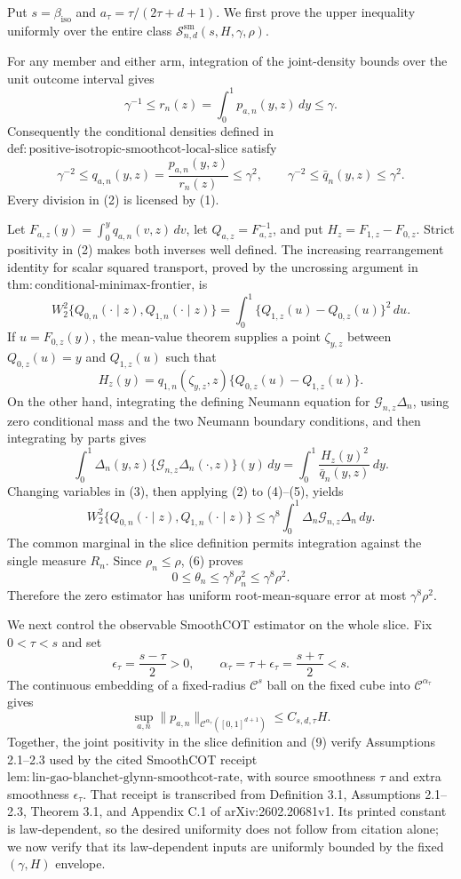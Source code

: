 Put \(s=\beta_{\mathrm{iso}}\) and \(a_\tau=\tau/(2\tau+d+1)\). We first prove the upper inequality uniformly over the entire class \(\mathcal S^{\mathrm{sm}}_{n,d}(s,H,\gamma,\rho)\).

For any member and either arm, integration of the joint-density bounds over the unit outcome interval gives
\[
\gamma^{-1}\le r_n(z)=\int_0^1p_{a,n}(y,z)\,dy\le\gamma.
\tag{1}
\]
Consequently the conditional densities defined in \(\mathrm{def{:}positive\text{-}isotropic\text{-}smoothcot\text{-}local\text{-}slice}\) satisfy
\[
\gamma^{-2}\le q_{a,n}(y,z)=\frac{p_{a,n}(y,z)}{r_n(z)}\le\gamma^2,
\qquad
\gamma^{-2}\le\bar q_n(y,z)\le\gamma^2.
\tag{2}
\]
Every division in (2) is licensed by (1).

Let \(F_{a,z}(y)=\int_0^yq_{a,n}(v,z)\,dv\), let \(Q_{a,z}=F_{a,z}^{-1}\), and put \(H_z=F_{1,z}-F_{0,z}\). Strict positivity in (2) makes both inverses well defined. The increasing rearrangement identity for scalar squared transport, proved by the uncrossing argument in \(\mathrm{thm{:}conditional\text{-}minimax\text{-}frontier}\), is
\[
W_2^2\{Q_{0,n}(\cdot\mid z),Q_{1,n}(\cdot\mid z)\}
=\int_0^1\{Q_{1,z}(u)-Q_{0,z}(u)\}^2\,du.
\tag{3}
\]
If \(u=F_{0,z}(y)\), the mean-value theorem supplies a point \(\zeta_{y,z}\) between \(Q_{0,z}(u)=y\) and \(Q_{1,z}(u)\) such that
\[
H_z(y)=q_{1,n}(\zeta_{y,z},z)\{Q_{0,z}(u)-Q_{1,z}(u)\}.
\tag{4}
\]
On the other hand, integrating the defining Neumann equation for \(\mathcal G_{n,z}\Delta_n\), using zero conditional mass and the two Neumann boundary conditions, and then integrating by parts gives
\[
\int_0^1\Delta_n(y,z)\{\mathcal G_{n,z}\Delta_n(\cdot,z)\}(y)\,dy
=\int_0^1\frac{H_z(y)^2}{\bar q_n(y,z)}\,dy.
\tag{5}
\]
Changing variables in (3), then applying (2) to (4)--(5), yields
\[
W_2^2\{Q_{0,n}(\cdot\mid z),Q_{1,n}(\cdot\mid z)\}
\le\gamma^8\int_0^1\Delta_n\mathcal G_{n,z}\Delta_n\,dy.
\tag{6}
\]
The common marginal in the slice definition permits integration against the single measure \(R_n\). Since \(\rho_n\le\rho\), (6) proves
\[
0\le\theta_n\le\gamma^8\rho_n^2\le\gamma^8\rho^2.
\tag{7}
\]
Therefore the zero estimator has uniform root-mean-square error at most \(\gamma^8\rho^2\).

We next control the observable SmoothCOT estimator on the whole slice. Fix \(0<\tau<s\) and set
\[
\epsilon_\tau=\frac{s-\tau}{2}>0,
\qquad
\alpha_\tau=\tau+\epsilon_\tau=\frac{s+\tau}{2}<s.
\tag{8}
\]
The continuous embedding of a fixed-radius \(\mathcal C^s\) ball on the fixed cube into \(\mathcal C^{\alpha_\tau}\) gives
\[
\sup_{a,n}\|p_{a,n}\|_{\mathcal C^{\alpha_\tau}([0,1]^{d+1})}
\le C_{s,d,\tau}H.
\tag{9}
\]
Together, the joint positivity in the slice definition and (9) verify Assumptions 2.1--2.3 used by the cited SmoothCOT receipt \(\mathrm{lem{:}lin\text{-}gao\text{-}blanchet\text{-}glynn\text{-}smoothcot\text{-}rate}\), with source smoothness \(\tau\) and extra smoothness \(\epsilon_\tau\). That receipt is transcribed from Definition 3.1, Assumptions 2.1--2.3, Theorem 3.1, and Appendix C.1 of arXiv:2602.20681v1. Its printed constant is law-dependent, so the desired uniformity does not follow from citation alone; we now verify that its law-dependent inputs are uniformly bounded by the fixed \((\gamma,H)\) envelope.

